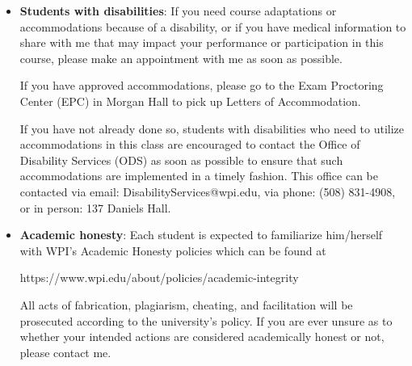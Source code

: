 \documentclass[11pt]{amsart}
\begin{document}
\begin{itemize}
\vspace{5pt}


\item \textbf{Students with disabilities}: If you need course adaptations or accommodations because of a disability, or if you have medical information to share with me that may impact your performance or participation in this course, please make an appointment with me as soon as possible.

If you have approved accommodations, please go to the Exam Proctoring Center (EPC) in Morgan Hall to pick up Letters of Accommodation.

If you have not already done so, students with disabilities who need to utilize accommodations in this class are encouraged to contact the Office of Disability Services (ODS) as soon as possible to ensure that such accommodations are implemented in a timely fashion. This office can be contacted via email: {DisabilityServices@wpi.edu}, via phone: (508) 831-4908, or in person: 137 Daniels Hall. 

\vspace{5pt}

\item \textbf{Academic honesty}: Each student is expected to familiarize him/herself with WPI's Academic Honesty policies which can be found at 
\begin{center}
https://www.wpi.edu/about/policies/academic-integrity 
\end{center}
All acts of fabrication, plagiarism, cheating, and facilitation will be prosecuted according to the university's policy. If you are ever unsure as to whether your intended actions are considered academically honest or not, please contact me.











\end{itemize}
\end{document}
